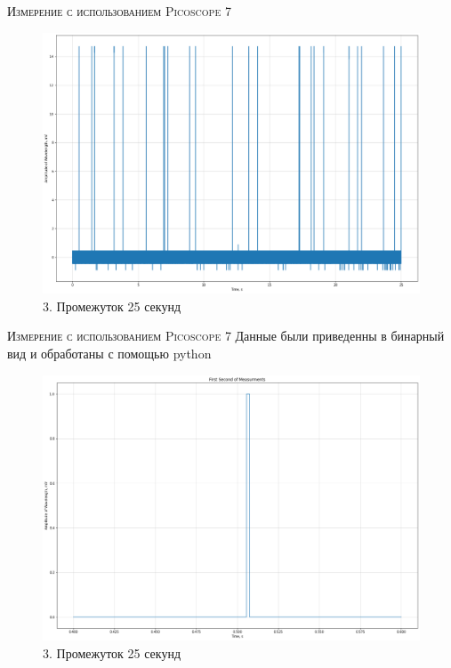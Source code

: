 \documentclass{beamer}%
\begin{document}
\begin{frame}{\textsc{Измерение с использованием Picoscope 7}}
\begin{figure}
    \centering
    \includegraphics[scale=0.25]{images/outputGraph2.png}
    \caption{3. Промежуток 25 секунд}
    \label{fig:my_label}
\end{figure}
\end{frame}  

\begin{frame}{\textsc{Измерение с использованием Picoscope 7}}
    \large Данные были приведенны в бинарный вид и обработаны с помощью python  
\begin{figure}
    \centering
    \includegraphics[scale=0.25]{images/outputBin.png}
    \caption{3. Промежуток 25 секунд}
    \label{fig:my_label}
\end{figure}
\end{frame}  
\end{document}
